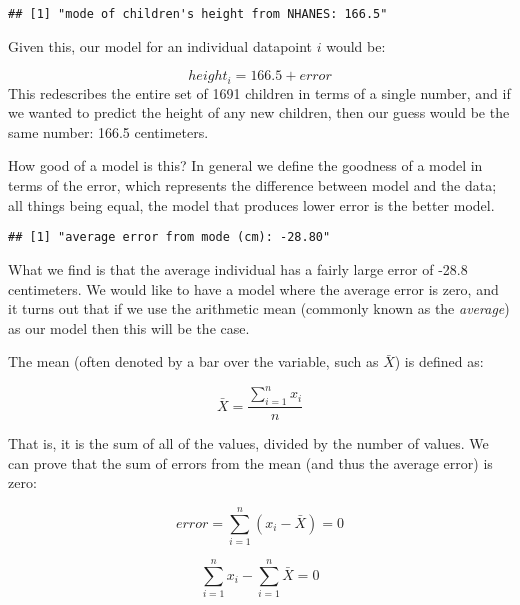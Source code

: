 \documentclass[]{book}
\newenvironment{Shaded}{\begin{snugshade}}{\end{snugshade}}
\newcommand{\KeywordTok}[1]{\textcolor[rgb]{0.13,0.29,0.53}{\textbf{#1}}}
\newcommand{\StringTok}[1]{\textcolor[rgb]{0.31,0.60,0.02}{#1}}
\newcommand{\CommentTok}[1]{\textcolor[rgb]{0.56,0.35,0.01}{\textit{#1}}}
\newcommand{\OperatorTok}[1]{\textcolor[rgb]{0.81,0.36,0.00}{\textbf{#1}}}
\newcommand{\NormalTok}[1]{#1}
\theoremstyle{definition}
\theoremstyle{definition}
\theoremstyle{definition}
\theoremstyle{remark}
\begin{document}
\begin{verbatim}
## [1] "mode of children's height from NHANES: 166.5"
\end{verbatim}

Given this, our model for an individual datapoint \(i\) would be:

\[
height_i = 166.5 + error
\] This redescribes the entire set of 1691 children in terms of a single
number, and if we wanted to predict the height of any new children, then
our guess would be the same number: 166.5 centimeters.

How good of a model is this? In general we define the goodness of a
model in terms of the error, which represents the difference between
model and the data; all things being equal, the model that produces
lower error is the better model.

\begin{Shaded}
\end{Shaded}

\begin{verbatim}
## [1] "average error from mode (cm): -28.80"
\end{verbatim}

What we find is that the average individual has a fairly large error of
-28.8 centimeters. We would like to have a model where the average error
is zero, and it turns out that if we use the arithmetic mean (commonly
known as the \emph{average}) as our model then this will be the case.

The mean (often denoted by a bar over the variable, such as \(\bar{X}\))
is defined as:

\[
\bar{X} = \frac{\sum_{i=1}^{n}x_i}{n}
\]

That is, it is the sum of all of the values, divided by the number of
values. We can prove that the sum of errors from the mean (and thus the
average error) is zero:

\[
error = \sum_{i=1}^{n}(x_i - \bar{X}) = 0
\]

\[
\sum_{i=1}^{n}x_i - \sum_{i=1}^{n}\bar{X}=0
\]
\end{document}
